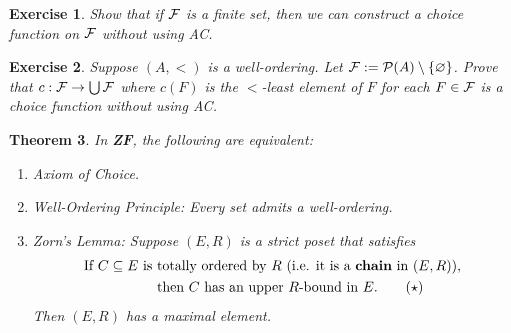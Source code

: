 \documentclass[10pt]{article}
\theoremstyle{newstyle}
\newtheorem{thm}{Theorem}[section]
\newtheorem{exercise}[thm]{Exercise}
\begin{document}
\begin{exercise}
Show that if ${\cal F}$ is a finite set, then we can construct a choice function on ${\cal F}$ 
without using AC.
\end{exercise}

\begin{exercise} 
Suppose $(A, <)$ is a well-ordering. Let ${\cal F} := {\cal P}(A) \setminus \{\varnothing\}$. 
Prove that $c : {\cal F} \to \bigcup {\cal F}$ where $c(F)$ is the $<$-least element 
of $F$ for each $F \in {\cal F}$ is a choice function without using AC.
\end{exercise}

\begin{thm}
In {\bf ZF}, the following are equivalent:  
\begin{enumerate}[(1)]
    \item Axiom of Choice. 
    \item Well-Ordering Principle: Every set admits a well-ordering. 
    \item Zorn's Lemma: Suppose $(E, R)$ is a strict poset that satisfies 
    \begin{align*} \text{If $C \subseteq E$ is } & \text{totally ordered by $R$ (i.e. it is a {\bf chain} in 
    $(E, R)$),} \\ &\text{then $C$ has an upper $R$-bound in $E$.} \tag{$\star$}\end{align*}
    Then $(E, R)$ has a maximal element.
\end{enumerate} 
\end{thm}
\end{document}
